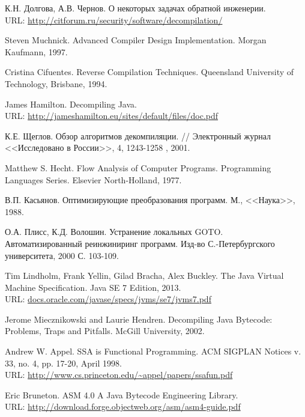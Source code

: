 \documentclass[14pt]{extarticle}
\begin{document}


\begin{thebibliography}{}

К.Н. Долгова, А.В. Чернов. 
О некоторых задачах обратной инженерии. \\
URL: \url{http://citforum.ru/security/software/decompilation/}

Steven Muchnick. 
Advanced Compiler Design Implementation.
Morgan Kaufmann, 1997.

Cristina Cifuentes.
Reverse Compilation Techniques.
Queensland University of Technology, Brisbane, 1994.

James Hamilton.
Decompiling Java. \\
URL: \url{http://jameshamilton.eu/sites/default/files/doc.pdf}

К.Е. Щеглов.  
Обзор алгоритмов декомпиляции. // Электронный журнал <<Исследовано в России>>, 4, 1243-1258 , 2001. 

Matthew S. Hecht. Flow Analysis of Computer Programs. Programming Languages Series. Elsevier North-Holland,
1977.

В.П. Касьянов. 
Оптимизирующие преобразования программ. М., <<Наука>>, 1988.

О.А. Плисс, К.Д. Волошин.
Устранение локальных GOTO. \\
Автоматизированный реинжиниринг программ.
Изд-во С.-Петербургского университета, 2000 С. 103-109.

Tim Lindholm, Frank Yellin, Gilad Bracha, Alex Buckley.
The Java Virtual Machine Specification.
Java SE 7 Edition, 2013. \\
URL: \url{docs.oracle.com/javase/specs/jvms/se7/jvms7.pdf}

Jerome Miecznikowski and Laurie Hendren. 
Decompiling Java Bytecode: Problems, Traps and Pitfalls. 
McGill University, 2002.

Andrew W. Appel.
SSA is Functional Programming.
ACM SIGPLAN Notices v. 33, no. 4, pp. 17-20, April 1998. \\
URL: \url{http://www.cs.princeton.edu/~appel/papers/ssafun.pdf}

Eric Bruneton.
ASM 4.0 A Java Bytecode Engineering Library. \\
URL: \url{http://download.forge.objectweb.org/asm/asm4-guide.pdf}

\end{thebibliography}
\end{document}
